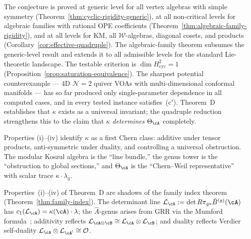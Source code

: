 \begin{remark}
\label{rem:scalar-saturation-evidence}
The conjecture is proved at generic level for all vertex algebras
with simple symmetry (Theorem~\ref{thm:cyclic-rigidity-generic}),
at all non-critical levels for algebraic families with rational
OPE coefficients
(Theorem~\ref{thm:algebraic-family-rigidity}),
and at all levels for KM, all $\mathcal{W}$-algebras, diagonal
cosets, and products (Corollary~\ref{cor:effective-quadruple}).
The algebraic-family theorem subsumes the generic-level result
and extends it to all admissible levels for the standard
Lie-theoretic landscape.
The testable criterion is $\dim H^2_{\mathrm{cyc}} = 1$
(Proposition~\ref{prop:saturation-equivalence}).
The sharpest potential counterexample --- 4D $\mathcal{N}=2$
quiver VOAs with multi-dimensional conformal manifolds ---
has so far produced only single-parameter dependence in all
computed cases, and in every tested instance satisfies~(c$'$).
Theorem~D establishes that $\kappa$ exists as a universal
invariant; the quadruple reduction strengthens this to the
claim that $\kappa$ \emph{determines} $\Theta_{\cA}$ completely.
\end{remark}

\begin{remark}
\label{rem:kappa-first-chern}
Properties (i)--(iv) identify $\kappa$ as a first Chern class: additive under tensor products, anti-symmetric under duality, and controlling a universal obstruction.  The modular Koszul algebra is the ``line bundle,'' the genus tower is the ``obstruction to global sections,'' and $\Theta_{\cA}$ is the ``Chern--Weil representative'' with scalar trace $\kappa \cdot \lambda_g$.
\end{remark}

\begin{remark}\label{rem:homotopy-native-d}
Properties~(i)--(iv) of Theorem~D are shadows of the family index
theorem (Theorem~\ref{thm:family-index}).
The determinant line $\mathcal{L}_{\cA} := \det R\pi_{g*}\bar{B}^{(g)}(\cA)$
has $c_1(\mathcal{L}_{\cA}) = \kappa(\cA)\cdot\lambda$;
the $\hat{A}$-genus arises from GRR via the Mumford
formula~\cite{Mumford83}; additivity reflects
$\mathcal{L}_{\cA\otimes\cB}\cong\mathcal{L}_{\cA}\otimes\mathcal{L}_{\cB}$;
and duality reflects Verdier self-duality
$\mathcal{L}_{\cA}\otimes\mathcal{L}_{\cA^!}\cong\mathcal{O}$.
\end{remark}


